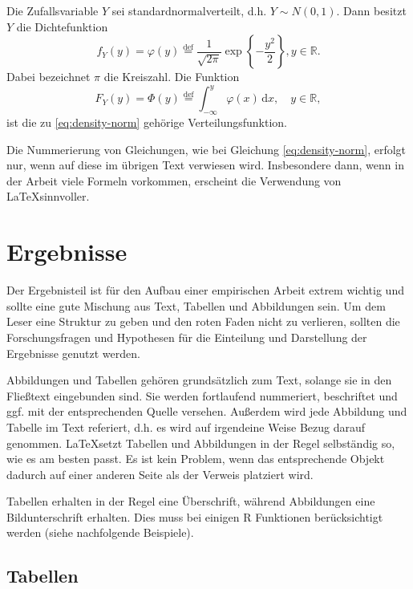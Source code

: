 \documentclass[a4paper,12pt]{article}
\begin{document}
Die Zufallsvariable \(Y\) sei standardnormalverteilt, d.h. \(Y \sim N(0,1)\). Dann besitzt \(Y\) die Dichtefunktion
\begin{equation} \label{eq:density-norm}
  f_{Y}(y)=\varphi(y) \stackrel{\mathrm{def}}{=} \frac{1}{\sqrt{2 \pi}} \exp \left\{ -\frac{y^2}{2} \right\}, y \in \mathbb{R}.
\end{equation}
Dabei bezeichnet \(\pi\) die Kreiszahl. Die Funktion
\begin{equation*}
  F_{Y}(y) = \Phi(y) \stackrel{\mathrm{def}}{=} \int_{-\infty}^y \varphi(x) \,\mathrm{d}x, \quad y \in \mathbb{R},
\end{equation*}
ist die zu \eqref{eq:density-norm} gehörige Verteilungsfunktion.

Die Nummerierung von Gleichungen, wie bei Gleichung \eqref{eq:density-norm}, erfolgt nur, wenn auf diese im übrigen Text verwiesen wird. Insbesondere dann, wenn in der Arbeit viele Formeln vorkommen, erscheint die Verwendung von \LaTeX sinnvoller.

\hypertarget{ergebnisse}{%
\section{Ergebnisse}\label{ergebnisse}}

Der Ergebnisteil ist für den Aufbau einer empirischen Arbeit extrem wichtig und sollte eine gute Mischung aus Text, Tabellen und Abbildungen sein. Um dem Leser eine Struktur zu geben und den roten Faden nicht zu verlieren, sollten die Forschungsfragen und Hypothesen für die Einteilung und Darstellung der Ergebnisse genutzt werden.

Abbildungen und Tabellen gehören grundsätzlich zum Text, solange sie in den Fließtext eingebunden sind. Sie werden fortlaufend nummeriert, beschriftet und ggf. mit der entsprechenden Quelle versehen. Außerdem wird jede Abbildung und Tabelle im Text referiert, d.h. es wird auf irgendeine Weise Bezug darauf genommen. \LaTeX setzt Tabellen und Abbildungen in der Regel selbständig so, wie es am besten passt. Es ist kein Problem, wenn das entsprechende Objekt dadurch auf einer anderen Seite als der Verweis platziert wird.

Tabellen erhalten in der Regel eine Überschrift, während Abbildungen eine Bildunterschrift erhalten. Dies muss bei einigen R Funktionen berücksichtigt werden (siehe nachfolgende Beispiele).

\hypertarget{tabellen}{%
\subsection{Tabellen}\label{tabellen}}
\end{document}
